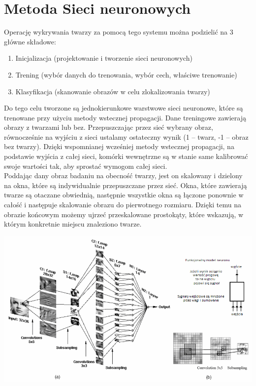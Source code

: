 \documentclass[11pt,a4paper]{article}
\begin{document}
\section{Metoda Sieci neuronowych}
Operację wykrywania twarzy za pomocą tego systemu można podzielić na 3 główne składowe:
\begin{enumerate}
\item Inicjalizacja (projektowanie i tworzenie sieci neuronowych)
\item Trening (wybór danych do trenowania, wybór cech, właściwe trenowanie)
\item Klasyfikacja (skanowanie obrazów w celu zlokalizowania twarzy)
\end{enumerate}

\noindent 
Do tego celu tworzone są jednokierunkowe warstwowe sieci neuronowe, które są trenowane przy użyciu metody wstecznej propagacji. Dane treningowe zawierają obrazy z twarzami lub bez. Przepuszczając przez sieć wybrany obraz, równocześnie na wyjściu z sieci ustalamy ostateczny wynik (1 – twarz, -1 – obraz bez twarzy).  Dzięki wspomnianej wcześniej metody wstecznej propagacji, na podstawie wyjścia z całej sieci, komórki wewnętrzne są w stanie same kalibrować swoje wartości tak, aby sprostać wymogom całej sieci.\\
Poddając dany obraz badaniu na obecność twarzy, jest on skalowany i dzielony na okna, które są indywidualnie przepuszczane przez sieć. Okna, które zawierają twarze są otaczane obwiednią, następnie wszystkie okna są łączone ponownie w całość i następuje skalowanie obrazu do pierwotnego rozmiaru. Dzięki temu na obrazie końcowym możemy ujrzeć przeskalowane prostokąty, które wskazują, w którym konkretnie miejscu znaleziono twarze.

\vspace*{1cm}
\includegraphics[scale=0.65]{cnn.png}
\vspace*{1cm}
\end{document}
